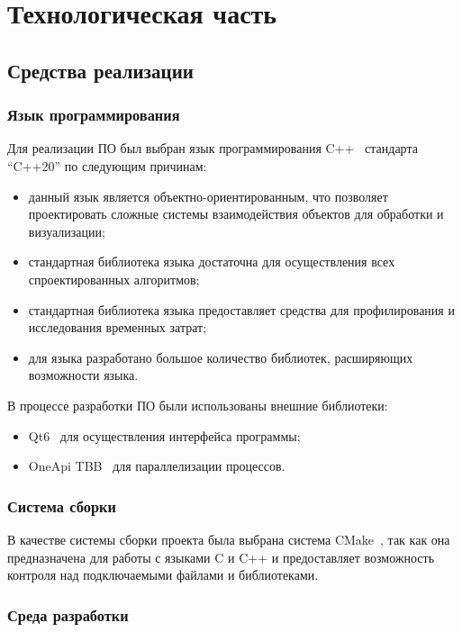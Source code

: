 \chapter{Технологическая часть}

\section{Средства реализации}

\subsection*{Язык программирования}

Для реализации ПО был выбран язык программирования C++~\cite{cpp} стандарта ``C++20'' по следующим причинам:
\begin{itemize}
  \item данный язык является объектно-ориентированным, что позволяет проектировать сложные системы взаимодействия объектов для обработки и визуализации;
  \item стандартная библиотека языка достаточна для осуществления всех спроектированных алгоритмов;
  \item стандартная библиотека языка предоставляет средства для профилирования и исследования временных затрат;
  \item для языка разработано большое количество библиотек, расширяющих возможности языка. 
\end{itemize}

В процессе разработки ПО были использованы внешние библиотеки:
\begin{itemize}
  \item Qt6~\cite{qt} для осуществления интерфейса программы;
  \item OneApi TBB~\cite{tbb} для параллелизации процессов.
\end{itemize}

\subsection*{Система сборки}

В качестве системы сборки проекта была выбрана система CMake~\cite{CMake}, так как она предназначена для работы с языками C и C++ и предоставляет возможность контроля над подключаемыми файлами и библиотеками.

\subsection*{Среда разработки}

